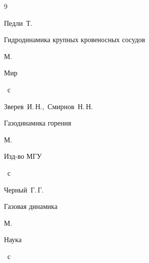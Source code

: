 \begin{thebibliography}{9}

\by Педли~Т.

\book Гидродинамика крупных кровеносных сосудов

\publaddr М.

\publ Мир


~с




\by Зверев~И.\,Н.,~Смирнов~Н.\,Н.

\book Газодинамика горения

\publaddr М.

\publ Изд-во МГУ


~с






\by Черный~Г.\,Г.

\book Газовая динамика

\publaddr М.

\publ Наука


~с





\end{thebibliography}







\newpage










\makeengtitlem






%


%




